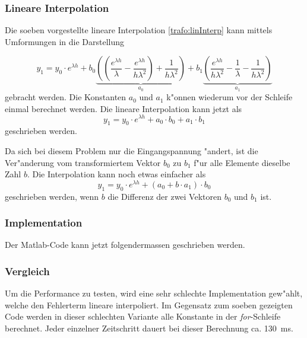 \begin{refsection}
\subsubsection{Lineare Interpolation}
Die soeben vorgestellte lineare Interpolation \ref{trafo:linInterp} kann mittels Umformungen in die Darstellung 

\begin{equation*}
	y_1 = y_0 \cdot e^{\lambda h} + b_0 \underbrace{\left(\left(\frac{e^{\lambda h}}{\lambda} - \frac{e^{\lambda h}}{h\lambda ^2}\right) + \frac{1}{h \lambda^2}\right)}_{a_0} + b_1 \underbrace{\left(\frac{e^{\lambda h}}{h \lambda^2} - \frac{1}{\lambda} - \frac{1}{h \lambda^2}\right)}_{a_1}
\end{equation*} 
gebracht werden. Die Konstanten $a_0$ und $a_1$ k"onnen wiederum vor der Schleife einmal berechnet werden. Die lineare Interpolation kann jetzt als 
\begin{equation*}
	y_1 = y_0 \cdot e^{\lambda h} + a_0 \cdot b_0 + a_1 \cdot b_1
\end{equation*}
geschrieben werden. 

Da sich bei diesem Problem nur die Eingangspannung "andert, ist die Ver"anderung vom transformiertem Vektor $b_0$ zu $b_1$ f"ur alle Elemente dieselbe Zahl $b$. Die Interpolation kann noch etwas einfacher als
\begin{equation*}
	y_1 = y_0 \cdot e^{\lambda h} + (a_0 + b \cdot  a_1) \cdot b_0
\end{equation*}
geschrieben werden, wenn $b$ die Differenz der zwei Vektoren $b_0$ und $b_1$ ist. 

\subsubsection{Implementation}
Der Matlab-Code kann jetzt folgendermassen geschrieben werden.

{\scriptsize }


\subsubsection{Vergleich}

Um die Performance zu testen, wird eine sehr schlechte Implementation gew"ahlt, welche den Fehlerterm lineare interpoliert. Im Gegensatz zum soeben gezeigten Code werden in dieser schlechten Variante alle Konstante in der \textit{for}-Schleife berechnet. Jeder einzelner Zeitschritt dauert bei dieser Berechnung ca. \SI{130}{\milli\second}. 


\end{refsection}
